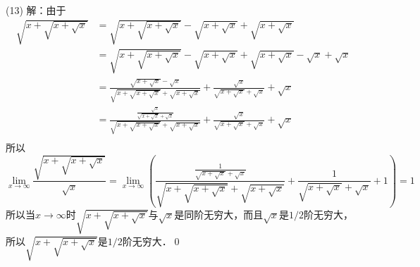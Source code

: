 \medskip
(13) 解：由于
\begin{align}
    \displaystyle\sqrt{x+\displaystyle\sqrt{x+\displaystyle\sqrt{x}}} &= \displaystyle\sqrt{x+\displaystyle\sqrt{x+\displaystyle\sqrt{x}}} - \displaystyle\sqrt{x+\displaystyle\sqrt{x}} + \displaystyle\sqrt{x+\displaystyle\sqrt{x}} \\
    &= \displaystyle\sqrt{x+\displaystyle\sqrt{x+\displaystyle\sqrt{x}}} - \displaystyle\sqrt{x+\displaystyle\sqrt{x}} + \displaystyle\sqrt{x+\displaystyle\sqrt{x}} - \sqrt{x} + \sqrt{x} \\
    &= \frac{\displaystyle\sqrt{x+\displaystyle\sqrt{x}}-\displaystyle\sqrt{x}}{\displaystyle\sqrt{x+\displaystyle\sqrt{x+\displaystyle\sqrt{x}}}+\displaystyle\sqrt{x+\displaystyle\sqrt{x}}} + \displaystyle\frac{\displaystyle\sqrt{x}}{\displaystyle\sqrt{x+\displaystyle\sqrt{x}}+\displaystyle\sqrt{x}} + \sqrt{x} \\
    &= \frac{\displaystyle\frac{\displaystyle\sqrt{x}}{\displaystyle\sqrt{x+\displaystyle\sqrt{x}}+\displaystyle\sqrt{x}}}{\displaystyle\sqrt{x+\displaystyle\sqrt{x+\displaystyle\sqrt{x}}}+\displaystyle\sqrt{x+\displaystyle\sqrt{x}}} + \displaystyle\frac{\displaystyle\sqrt{x}}{\displaystyle\sqrt{x+\displaystyle\sqrt{x}}+\displaystyle\sqrt{x}} + \sqrt{x} \\
\end{align}
所以
\begin{equation}
    \lim_{x \to \infty} \frac{\displaystyle\sqrt{x+\displaystyle\sqrt{x+\displaystyle\sqrt{x}}}}{\displaystyle\sqrt{x}} = \lim_{x \to \infty} \left( \frac{\displaystyle\frac{1}{\displaystyle\sqrt{x+\displaystyle\sqrt{x}}+\displaystyle\sqrt{x}}}{\displaystyle\sqrt{x+\displaystyle\sqrt{x+\displaystyle\sqrt{x}}}+ \displaystyle\sqrt{x+\displaystyle\sqrt{x}}} + \frac{1}{\displaystyle\sqrt{x+\displaystyle\sqrt{x}}+\displaystyle\sqrt{x}} + 1 \right) = 1
\end{equation}
所以当$x \to \infty$时$\displaystyle\sqrt{x+\displaystyle\sqrt{x+\displaystyle\sqrt{x}}}$与$\sqrt{x}$是同阶无穷大，而且$\displaystyle\sqrt{x}$是$1/2$阶无穷大，所以$\displaystyle\sqrt{x+\displaystyle\sqrt{x+\displaystyle\sqrt{x}}}$是$1/2$阶无穷大．\qed